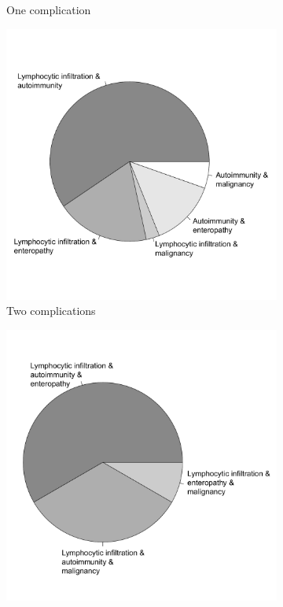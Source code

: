 \begin{figure}[H]
\begin{subfigure}[b]{0.49\textwidth}
	\caption{One complication}%
\end{subfigure}
\begin{subfigure}[b]{0.49\textwidth}
	\centering
	\includegraphics[width=\textwidth]{./Introduction/Pie_2complication.pdf}%
	\caption{Two complications}%
\end{subfigure}
\begin{subfigure}[b]{0.49\textwidth}
	\centering
	\includegraphics[width=\textwidth]{./Introduction/Pie_3complication.pdf}%

\end{subfigure}
\end{figure}
